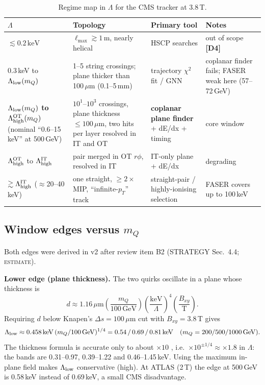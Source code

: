\documentclass[11pt,a4paper]{article}
\newcommand{\EST}{\textsc{estimate}}
\newcommand{\mQ}{m_Q}
\newcommand{\GeV}{\,\mathrm{GeV}}
\newcommand{\keV}{\,\mathrm{keV}}
\newcommand{\um}{\,\mu\mathrm{m}}
\newcommand{\lab}[1]{\textbf{[#1]}}
\begin{document}
{\small
\begin{longtable}{@{}L{3.34cm}L{5.06cm}L{3.44cm}L{4.25cm}@{}}
\caption{Regime map in $\Lambda$ for the CMS tracker at 3.8\,T.}\label{tab:regimes}\\
\toprule $\Lambda$ & Topology & Primary tool & Notes\\\midrule\endfirsthead
\bottomrule\endfoot
$\lesssim0.2\keV$ & $\ell_{\max}\gtrsim1$\,m, nearly helical & HSCP searches & out of scope \lab{D4}\\
0.3\,keV to $\Lambda_{\rm low}(\mQ)$ & 1--5 string crossings; plane thicker than 100\,$\mu$m (0.1--5\,mm) & trajectory $\chi^2$ fit / GNN & coplanar finder fails; FASER weak here (57--72\,GeV)\\
\textbf{$\Lambda_{\rm low}(\mQ)$ to $\Lambda_{\rm high}^{\rm OT}(\mQ)$} (nominal ``0.6--15\,keV'' at 500\,GeV) & $10^1$--$10^3$ crossings, plane thickness $\leq100\um$, two hits per layer resolved in IT and OT & \textbf{coplanar plane finder} + dE/dx + timing & core window\\
$\Lambda_{\rm high}^{\rm OT}$ to $\Lambda_{\rm high}^{\rm IT}$ & pair merged in OT $r\phi$, resolved in IT & IT-only plane + dE/dx & degrading\\
$\gtrsim\Lambda_{\rm high}^{\rm IT}$ ($\approx$20--40\,keV) & one straight, $\geq2\times$ MIP, ``infinite-$p_T$'' track & straight-pair / highly-ionising selection & FASER covers up to 100\,keV\\
\end{longtable}
}

\subsection{Window edges versus $\mQ$}\label{sec:edges}
Both edges were derived in v2 after review item B2 (STRATEGY Sec.~4.4; \EST).

\textbf{Lower edge (plane thickness).} The two quirks oscillate in a plane whose thickness is \cite{LiLi}
\begin{equation}
d\approx1.16\um\left(\frac{\mQ}{100\GeV}\right)\left(\frac{\mathrm{keV}}{\Lambda}\right)^{4}\left(\frac{B_{xy}}{\mathrm{T}}\right).
\end{equation}
Requiring $d$ below Knapen's $\Delta s=100\um$ cut \cite{Knapen} with $B_{xy}=3.8$\,T gives
\begin{equation}
\Lambda_{\rm low}\approx0.458\keV\,(\mQ/100\GeV)^{1/4}=0.54\,/\,0.69\,/\,0.81\keV\quad(\mQ=200/500/1000\GeV).
\end{equation}
The thickness formula is accurate only to about $\times10$ \cite{traj}, i.e.\ $\times10^{\pm1/4}\approx\times1.8$ in $\Lambda$: the bands are 0.31--0.97, 0.39--1.22 and 0.46--1.45\,keV. Using the maximum in-plane field makes $\Lambda_{\rm low}$ conservative (high). At ATLAS (2\,T) the edge at 500\,GeV is 0.58\,keV instead of 0.69\,keV, a small CMS disadvantage.
\end{document}
